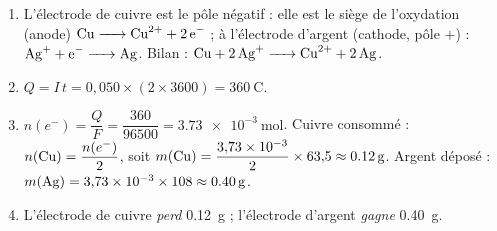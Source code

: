\begin{enumerate}[label=\arabic*)]
\item L'électrode de cuivre est le pôle négatif : elle est le siège de l'oxydation
(anode) $\ce{Cu -> Cu^2+ + 2 e-}$ ; à l'électrode d'argent (cathode, pôle $+$) :
$\ce{Ag+ + e- -> Ag}$. Bilan : $\ce{Cu + 2 Ag+ -> Cu^2+ + 2 Ag}$.
\item $Q = I\,t = 0{,}050\times(2\times3600) = \SI{360}{\coulomb}$.
\item $n(e^-) = \dfrac{Q}{F} = \dfrac{360}{96500} = \SI{3.73e-3}{\mol}$.
Cuivre consommé : $n(\ce{Cu}) = \dfrac{n(e^-)}{2}$, soit
$m(\ce{Cu}) = \dfrac{3{,}73\times10^{-3}}{2}\times63{,}5 \approx \SI{0.12}{\gram}$.
Argent déposé : $m(\ce{Ag}) = 3{,}73\times10^{-3}\times108 \approx \SI{0.40}{\gram}$.
\item L'électrode de cuivre \emph{perd} \SI{0.12}{\gram} ; l'électrode d'argent
\emph{gagne} \SI{0.40}{\gram}.
\end{enumerate}
